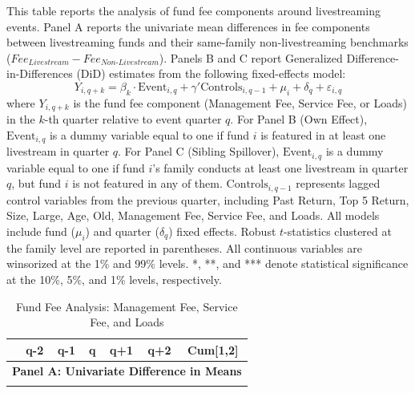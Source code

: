   \begin{landscape}

    \begin{table}[!ht]
      \caption{Fund Fee Analysis: Management Fee, Service Fee, and Loads}\label{tab:fund_fee}
      \footnotesize{
      This table reports the analysis of fund fee components around livestreaming events. Panel A reports the univariate
  mean differences in fee components between livestreaming funds and their same-family non-livestreaming benchmarks
  ($Fee_{Livestream} - Fee_{Non\mbox{-}Livestream}$). Panels B and C report Generalized Difference-in-Differences (DiD)
  estimates from the following fixed-effects model:
      \[
      Y_{i,q+k} = \beta_k \cdot \text{Event}_{i,q} + \gamma' \text{Controls}_{i,q-1} + \mu_i + \delta_q +
  \varepsilon_{i,q}
      \]
      where $Y_{i,q+k}$ is the fund fee component (Management Fee, Service Fee, or Loads) in the $k$-th quarter relative
  to event quarter $q$. For Panel B (Own Effect), $\text{Event}_{i,q}$ is a dummy variable equal to one if fund $i$ is
  featured in at least one livestream in quarter $q$. For Panel C (Sibling Spillover), $\text{Event}_{i,q}$ is a dummy
  variable equal to one if fund $i$'s family conducts at least one livestream in quarter $q$, but fund $i$ is not
  featured in any of them. $\text{Controls}_{i,q-1}$ represents lagged control variables from the previous quarter,
  including Past Return, Top 5 Return, Size, Large, Age, Old, Management Fee, Service Fee, and Loads. All models include
  fund ($\mu_i$) and quarter ($\delta_q$) fixed effects. Robust $t$-statistics clustered at the family level are
  reported in parentheses. All continuous variables are winsorized at the 1\% and 99\% levels. *, **, and *** denote
  statistical significance at the 10\%, 5\%, and 1\% levels, respectively.}

      \vspace{.1in}
      \centering

      \bgroup%
      \def\sym#1{\ifmmode^{#1}\else\(^{#1}\)\fi}
      \setlength{\tabcolsep}{4pt}

      \small
      \renewcommand{\arraystretch}{0.84}

      \begin{tabular}{l*{6}{c}}
          \toprule
          & q-2 & q-1 & q & q+1 & q+2 & Cum[1,2] \\
          \midrule

          \multicolumn{7}{l}{\textbf{Panel A\@: Univariate Difference in Means}} \\
          \midrule
          \\
          \midrule


\end{tabular}
\end{table}
\end{landscape}
